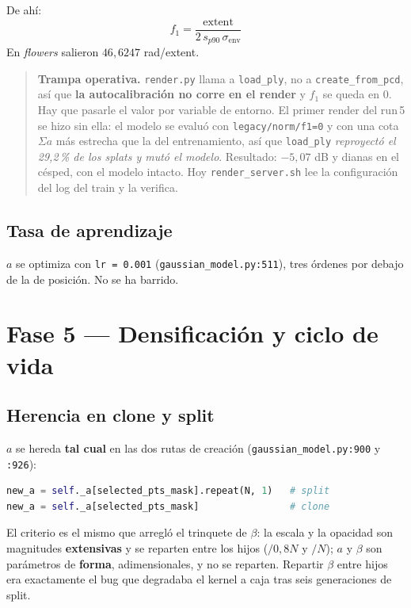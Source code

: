 \documentclass[12pt]{extarticle}
\newcommand{\ssum}{\Sigma a}
\newcommand{\code}[1]{\texttt{#1}}
\begin{document}
De ahí:
\[
f_1 = \frac{\text{extent}}{2\,s_{p90}\,\sigma_{\text{env}}}
\]
En \emph{flowers} salieron $46{,}6247$ rad/extent.

\begin{quote}
\textbf{Trampa operativa.} \code{render.py} llama a \code{load\_ply}, no a
\code{create\_from\_pcd}, así que \textbf{la autocalibración no corre en el
render} y $f_1$ se queda en $0$. Hay que pasarle el valor por variable de
entorno. El primer render del run\,5 se hizo sin ella: el modelo se evaluó con
\code{legacy/norm/f1=0} y con una cota $\ssum$ más estrecha que la del
entrenamiento, así que \code{load\_ply} \emph{reproyectó el 29,2\,\% de los
splats y mutó el modelo}. Resultado: $-5{,}07$ dB y dianas en el césped, con el
modelo intacto. Hoy \code{render\_server.sh} lee la configuración del log del
train y la verifica.
\end{quote}

\subsection{Tasa de aprendizaje}

$a$ se optimiza con \code{lr = 0.001} (\code{gaussian\_model.py:511}), tres
órdenes por debajo de la de posición. No se ha barrido.

\section{Fase 5 --- Densificación y ciclo de vida}

\subsection{Herencia en clone y split}

$a$ se hereda \textbf{tal cual} en las dos rutas de creación
(\code{gaussian\_model.py:900} y \code{:926}):

\begin{lstlisting}[language=Python]
new_a = self._a[selected_pts_mask].repeat(N, 1)   # split
new_a = self._a[selected_pts_mask]                # clone
\end{lstlisting}

El criterio es el mismo que arregló el trinquete de $\beta$: la escala y la
opacidad son magnitudes \textbf{extensivas} y se reparten entre los hijos
($/0{,}8N$ y $/N$); $a$ y $\beta$ son parámetros de \textbf{forma},
adimensionales, y no se reparten. Repartir $\beta$ entre hijos era exactamente
el bug que degradaba el kernel a caja tras seis generaciones de split.
\end{document}
